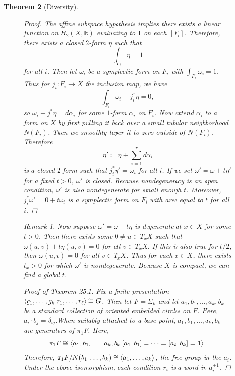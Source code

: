 \documentclass[leqno, openany]{memoir}
\newtheorem{thm}{Theorem}[chapter]
\theoremstyle{definition}
\theoremstyle{remark}
\newtheorem{rmk}[thm]{Remark}
\theoremstyle{plain}
\theoremstyle{definition}
\theoremstyle{remark}
\newcommand{\R}{\mathbb{R}}
\begin{document}
\begin{thm}[Diversity]
\begin{figure}[H]
    \begin{proof} The affine subspace hypothesis implies there exists a linear
        function on $H_2(X, \R)$ evaluating to $1$ on each $[F_i]$. Therefore,
        there exists a closed $2$-form $\eta$ such that \[ \int_{F_i} \eta = 1
        \] for all $i$. Then let $\omega_i$ be a symplectic form on $F_i$ with
        $\int_{F_i} \omega_i = 1$. Thus for $j_i: F_i \to X$ the inclusion map,
        we have \[ \int_{F_i} \omega_i - j_i^* \eta = 0, \] so $\omega_i - j^*
        \eta = d \alpha_i$ for some $1$-form $\alpha_i$ on $F_i$. Now extend
        $\alpha_i$ to a form on $X$ by first pulling it back over a small
        tubular neighborhood $N(F_i)$. Then we smoothly taper it to zero
        outside of $N(F_i)$. Therefore \[ \eta' \coloneqq \eta + \sum_{i=1}^r d
        \alpha_i \] is a closed $2$-form such that $j_i^* \eta' = \omega_i$ for
        all $i$. If we set $\omega' = \omega + t \eta'$ for a fixed $t > 0$,
        $\omega'$ is closed. Because nondegeneracy is an open condition,
        $\omega'$ is also nondegenerate for small enough $t$. Moreover, $j_i^*
        \omega' = 0 + t \omega_i$ is a symplectic form on $F_i$ with area equal
        to $t$ for all $i$.  \end{proof}

    \begin{rmk} Now suppose $\omega' = \omega + t \eta$ is degenerate at $x \in
        X$ for some $t > 0$. Then there exists some $0 \neq u \in T_x X$ such
        that $\omega(u,v) + t \eta(u,v) = 0$ for all $v \in T_x X$. If this is
        also true for $t/2$, then $\omega(u,v) = 0$ for all $v \in T_x X$. Thus
        for each $x \in X$, there exists $t_x > 0$ for which $\omega'$ is
        nondegenerate. Because $X$ is compact, we can find a global $t$.
    \end{rmk}

    \begin{proof}[Proof of Theorem 25.1] Fix a finite presentation $\ip{g_1,
        \ldots, g_k}{r_1, \ldots, r_{\ell}} \cong G$. Then let $F = \Sigma_k$
        and let $a_1, b_1, \ldots, a_k, b_k$ be a standard collection of
        oriented embedded circles on $F$. Here, $a_i \cdot b_j =
        \delta_{ij}$.When suitably attached to a base point, $a_1, b_1, \ldots,
        a_k, b_k$ are generators of $\pi_1 F$. Here, \[ \pi_1 F \cong
        \ip{a_1,b_1,\ldots, a_k, b_k}{[a_1,b_1]=\cdots=[a_k,b_k]=1}. \]
        Therefore, $\pi_1 F / N(b_1, \ldots, b_k) \cong \ev{a_1, \ldots, a_k}$,
        the free group in the $a_i$. Under the above isomorphism, each
        condition $r_i$ is a word in $a_i^{\pm 1}$. 


\end{proof}
\end{figure}
\end{thm}
\end{document}
